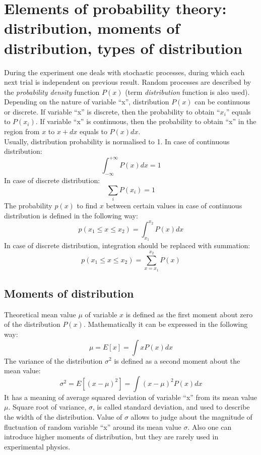 \documentclass[12pt,a4paper]{report}
\begin{document}
\section{Elements of probability theory: distribution, moments of distribution, types of distribution}
During the experiment one deals with stochastic processes, during which each next trial is independent on previous result. Random processes are described by the \textit{probability density} function $P(x)$ (term \textit{distribution} function is also used). Depending on the nature of variable \enquote{x}, distribution $P(x)$ can be continuous or discrete. If variable \enquote{x} is discrete, then the probability to obtain \enquote{$x_i$} equals to $P(x_i)$. If variable \enquote{x} is continuous, then the probability to obtain \enquote{x} in the region from $x$ to $x+dx$ equals to $P(x)dx$. \\
Usually, distribution probability is normalised to 1. In case of continuous distribution:
\begin{equation*}
\int_{-\infty}^{+\infty} P(x)dx = 1
\end{equation*}
In case of discrete distribution:
\begin{equation*}
\sum_{i} P(x_i) = 1
\end{equation*}
The probability $p(x)$ to find $x$ between certain values in case of continuous distribution is defined in the following way:
\begin{equation*}
p(x_1 \leq x \leq x_2) = \int_{x_1}^{x_2} P(x)dx
\end{equation*}
In case of discrete distribution, integration should be replaced with summation:
\begin{equation*}
p(x_1 \leq x \leq x_2) = \sum_{x = x_1}^{x_2} P(x)
\end{equation*}

\subsection{Moments of distribution}
Theoretical mean value $\mu$ of variable $x$ is defined as the first moment about zero of the distribution $P(x)$. Mathematically it can be expressed in the following way:
\begin{equation} \label{first_moment}
\mu = E[x] = \int x P(x) dx
\end{equation}
The variance of the distribution $\sigma^2$ is defined as a second moment about the mean value:
\begin{equation} \label{second_moment}
\sigma^2 = E[(x-\mu)^2] = \int (x-\mu)^2P(x)dx
\end{equation}
It has a meaning of average squared deviation of variable \enquote{x} from its mean value $\mu$. Square root of variance, $\sigma$, is called standard deviation, and used to describe the width of the distribution. Value of $\sigma$ allows to judge about the magnitude of fluctuation of random variable \enquote{x} around its mean value $\sigma$. Also one can introduce higher moments of distribution, but they are rarely used in experimental physics.
\end{document}
